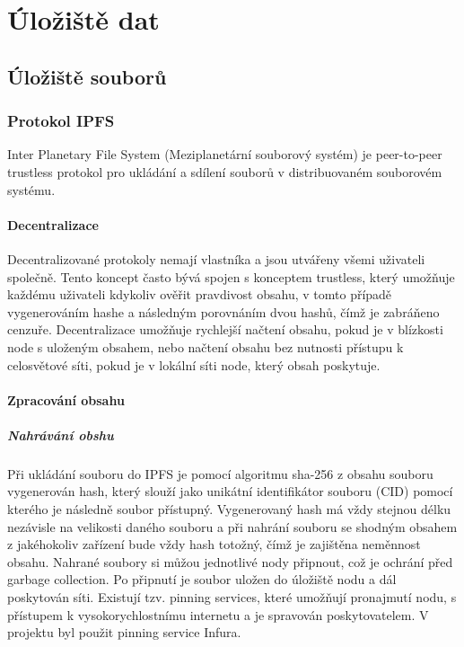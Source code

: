 \documentclass[12pt, a4paper,
 twoside,        %
 openright
]{report}
\begin{document}
\chapter{Úložiště dat}
    \section{Úložiště souborů}
        \subsection{Protokol IPFS}\label{subsection:IPFS}
        Inter Planetary File System (Meziplanetární souborový systém) je peer-to-peer trustless protokol pro ukládání a sdílení souborů v distribuovaném souborovém systému.
        \subsubsection{Decentralizace}
            Decentralizované protokoly nemají vlastníka a jsou utvářeny všemi uživateli společně. Tento koncept často bývá spojen s konceptem trustless, který umožňuje každému uživateli kdykoliv ověřit pravdivost obsahu, v tomto případě vygenerováním hashe a následným porovnáním dvou hashů, čímž je zabráňeno cenzuře. Decentralizace umožňuje rychlejší načtení obsahu, pokud je v blízkosti node s uloženým obsahem, nebo načtení obsahu bez nutnosti přístupu k celosvětové síti, pokud je v lokální síti node, který obsah poskytuje.
        \subsubsection{Zpracování obsahu}
            \paragraph{Nahrávání obshu}
            Při ukládání souboru do IPFS je pomocí algoritmu sha-256 z obsahu souboru vygenerován hash, který slouží jako unikátní identifikátor souboru (CID) pomocí kterého je následně soubor přístupný. Vygenerovaný hash má vždy stejnou délku nezávisle na velikosti daného souboru a při nahrání souboru se shodným obsahem z jakéhokoliv zařízení bude vždy hash totožný, čímž je zajištěna neměnnost obsahu. Nahrané soubory si můžou jednotlivé nody připnout, což je ochrání před garbage collection. Po připnutí je soubor uložen do úložiště nodu a dál poskytován síti. Existují tzv. pinning services, které umožňují pronajmutí nodu, s přístupem k vysokorychlostnímu internetu a je spravován poskytovatelem. V projektu byl použit pinning service Infura. 
\end{document}
